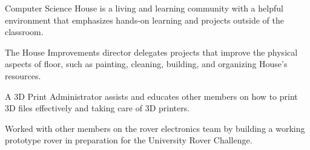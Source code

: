 \documentclass[a4paper]{comcv}
\begin{document}
\vspace{\topsep}
\begin{tightlist}
    \item Computer Science House is a living and learning community with a helpful environment that emphasizes hands-on learning and projects outside of the classroom.

    \item The House Improvements director delegates projects that improve the physical aspects of floor, such as painting, cleaning, building, and organizing House's resources.

	\item A 3D Print Administrator assists and educates other members on how to print 3D files effectively and taking care of 3D printers.
	
\end{tightlist}


\vspace{\topsep}
\begin{tightlist}
    \item Worked with other members on the rover electronics team by building a working prototype rover in preparation for the University Rover Challenge. 

\end{tightlist}
\end{document}
